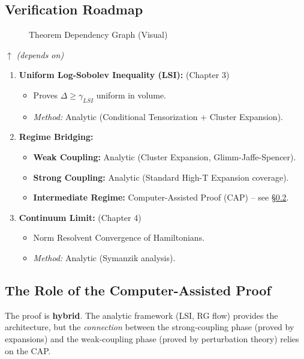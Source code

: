 \subsection{Verification Roadmap}
\begin{figure}[h]
\centering
\caption{Theorem Dependency Graph (Visual)}
\end{figure}
$\uparrow$ \textit{(depends on)}
\begin{enumerate}
    \item \textbf{Uniform Log-Sobolev Inequality (LSI):} (Chapter 3)
         \begin{itemize}
             \item Proves $\Delta \ge \gamma_{LSI}$ uniform in volume.
             \item \textit{Method:} Analytic (Conditional Tensorization + Cluster Expansion).
         \end{itemize}
    \item \textbf{Regime Bridging:}
         \begin{itemize}
             \item \textbf{Weak Coupling:} Analytic (Cluster Expansion, Glimm-Jaffe-Spencer).
             \item \textbf{Strong Coupling:} Analytic (Standard High-T Expansion coverage).
             \item \textbf{Intermediate Regime:} Computer-Assisted Proof (CAP) -- see \S\ref{sec:cap_dependency}.
         \end{itemize}
    \item \textbf{Continuum Limit:} (Chapter 4)
         \begin{itemize}
             \item Norm Resolvent Convergence of Hamiltonians.
             \item \textit{Method:} Analytic (Symanzik analysis).
         \end{itemize}
\end{enumerate}

\subsection{The Role of the Computer-Assisted Proof}
\label{sec:cap_dependency}
The proof is \textbf{hybrid}. The analytic framework (LSI, RG flow) provides the architecture, but the \textit{connection} between the strong-coupling phase (proved by expansions) and the weak-coupling phase (proved by perturbation theory) relies on the CAP.

